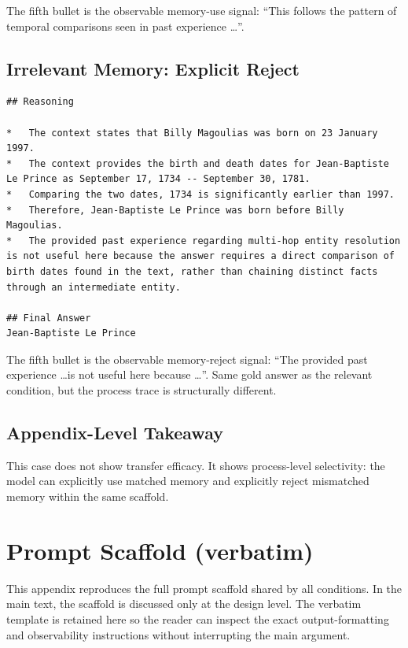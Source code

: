 The fifth bullet is the observable memory-use signal: ``This follows the pattern of temporal comparisons seen in past experience \ldots''.

\subsection{Irrelevant Memory: Explicit Reject}

\begin{lstlisting}
## Reasoning

*   The context states that Billy Magoulias was born on 23 January 1997.
*   The context provides the birth and death dates for Jean-Baptiste Le Prince as September 17, 1734 -- September 30, 1781.
*   Comparing the two dates, 1734 is significantly earlier than 1997.
*   Therefore, Jean-Baptiste Le Prince was born before Billy Magoulias.
*   The provided past experience regarding multi-hop entity resolution is not useful here because the answer requires a direct comparison of birth dates found in the text, rather than chaining distinct facts through an intermediate entity.

## Final Answer
Jean-Baptiste Le Prince
\end{lstlisting}

The fifth bullet is the observable memory-reject signal: ``The provided past experience \ldots is not useful here because \ldots''. Same gold answer as the relevant condition, but the process trace is structurally different.

\subsection{Appendix-Level Takeaway}

This case does not show transfer efficacy. It shows process-level selectivity: the model can explicitly use matched memory and explicitly reject mismatched memory within the same scaffold.

\section{Prompt Scaffold (verbatim)}
\label{app:prompt-scaffold}

This appendix reproduces the full prompt scaffold shared by all conditions. In the main text, the scaffold is discussed only at the design level. The verbatim template is retained here so the reader can inspect the exact output-formatting and observability instructions without interrupting the main argument.

